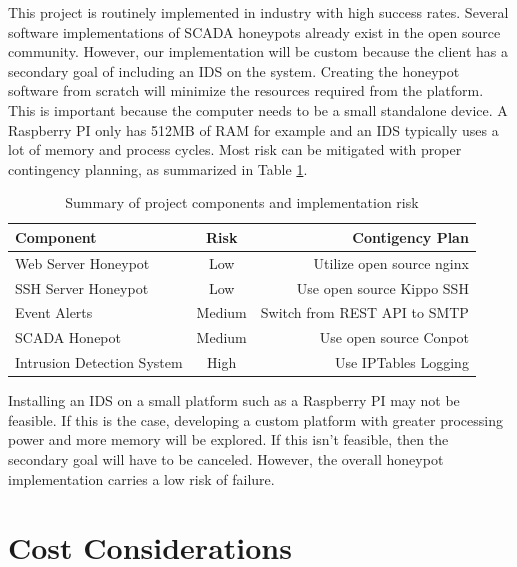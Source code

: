 This project is routinely implemented in industry with high success rates. Several software implementations of SCADA honeypots already exist in the open source community. However, our implementation will be custom because the client has a secondary goal of including an IDS on the system. Creating the honeypot software from scratch will minimize the resources required from the platform. This is important because the computer needs to be a small standalone device. A Raspberry PI only has 512MB of RAM for example and an IDS typically uses a lot of memory and process cycles. Most risk can be mitigated with proper contingency planning, as summarized in Table \ref{table:risk}.


\vspace{0.5cm}
\begin{table}[h]
\centering
\begin{tabular}{l  c  r}
Component & Risk & Contigency Plan \\
\hline
Web Server Honeypot & Low & Utilize open source nginx\footnotemark \\
SSH Server Honeypot & Low & Use open source Kippo SSH\footnotemark \\
Event Alerts & Medium & Switch from REST API to SMTP \\
SCADA Honepot & Medium & Use open source Conpot\footnotemark \\
Intrusion Detection System & High &  Use IPTables Logging \\
\end{tabular}
\caption{Summary of project components and implementation risk}
\label{table:risk}
\end{table}
\vspace{0.3cm}

\addtocounter{footnote}{-1}

\addtocounter{footnote}{1}

\addtocounter{footnote}{1}

Installing an IDS on a small platform such as a Raspberry PI may not be feasible. If this is the case, developing a custom platform with greater processing power and more memory will be explored. If this isn't feasible, then the secondary goal will have to be canceled. However, the overall honeypot implementation carries a low risk of failure.

\section{Cost Considerations}

